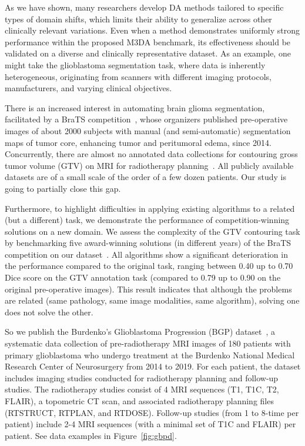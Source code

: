 As we have shown, many researchers develop DA methods tailored to specific types of domain shifts, which limits their ability to generalize across other clinically relevant variations. Even when a method demonstrates uniformly strong performance within the proposed M3DA benchmark, its effectiveness should be validated on a diverse and clinically representative dataset. As an example, one might take the glioblastoma segmentation task, where data is inherently heterogeneous, originating from scanners with different imaging protocols, manufacturers, and varying clinical objectives.

There is an increased interest in automating brain glioma segmentation, facilitated by a BraTS competition~\cite{brats}, whose organizers published pre-operative images of about 2000 subjects with manual (and semi-automatic) segmentation maps of tumor core, enhancing tumor and peritumoral edema, since 2014. Concurrently, there are almost no annotated data collections for contouring gross tumor volume (GTV) on MRI for radiotherapy planning~\cite{menze2021analyzing}. All publicly available datasets are of a small scale of the order of a few dozen patients. Our study is going to partially close this gap.

Furthermore, to highlight difficulties in applying existing algorithms to a related (but a different) task, we demonstrate the performance of competition-winning solutions on a new domain. We assess the complexity of the GTV contouring task by benchmarking five award-winning solutions (in different years) of the BraTS competition on our dataset~\cite{kofler2020brats,isensee2018nnu,kickingereder2019automated,bakas2017advancing}. All algorithms show a significant deterioration in the performance compared to the original task, ranging between 0.40 up to 0.70 Dice score on the GTV annotation task (compared to 0.79 up to 0.90 on the original pre-operative images). This result indicates that although the problems are related (same pathology, same image modalities, same algorithm), solving one does not solve the other.


So we publish the Burdenko's Glioblastoma Progression (BGP) dataset~\cite{Zolotova2023Burdenko}, a systematic data collection of pre-radiotherapy MRI images of 180 patients with primary glioblastoma who undergo treatment at the Burdenko National Medical Research Center of Neurosurgery from 2014 to 2019. For each patient, the dataset includes imaging studies conducted for radiotherapy planning and follow-up studies. The radiotherapy studies consist of 4 MRI sequences (T1, T1C, T2, FLAIR), a topometric CT scan, and associated radiotherapy planning files (RTSTRUCT, RTPLAN, and RTDOSE). Follow-up studies (from 1 to 8-time per patient) include 2-4 MRI sequences (with a minimal set of T1C and FLAIR) per patient. See data examples in Figure~\ref{fig:gbpd}. %

